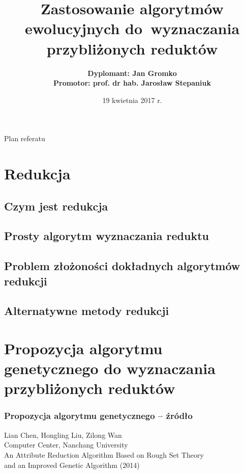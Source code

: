 \documentclass[10pt]{beamer}
\title[Zastosowanie algorytmów ewolucyjnych do wyznaczania przybliżonych reduktów] %
{ %
      \textbf{Zastosowanie algorytmów ewolucyjnych do~wyznaczania przybliżonych reduktów}
}
\author[Jan Gromko]
{
	\textbf{Dyplomant: Jan Gromko}\\
	\textbf{Promotor: prof. dr hab. Jarosław Stepaniuk}
}
\institute[WI PB]
{
      Wydział Informatyki Politechniki Białostockiej
}
\date{19 kwietnia 2017 r.}
\begin{document}
{\1%
\begin{frame}
\begin{spacing}{1.5}
  \titlepage
\end{spacing}
\end{frame}}


\begin{frame}{Plan referatu}{}
\tableofcontents
\end{frame}


\section{Redukcja}

\subsection{Czym jest redukcja}


\subsection{Prosty algorytm wyznaczania reduktu}


\subsection{Problem złożoności dokładnych algorytmów redukcji}


\subsection{Alternatywne metody redukcji}


\section{Propozycja algorytmu genetycznego do wyznaczania przybliżonych reduktów}
\begin{frame}
\frametitle{Propozycja algorytmu genetycznego -- źródło}

Lian Chen, Hongling Liu, Zilong Wan\\
Computer Center, Nanchang University\\
\newblock An Attribute Reduction Algorithm Based on Rough Set Theory\\
and an Improved Genetic Algorithm (2014)

\end{frame}

\end{document}
